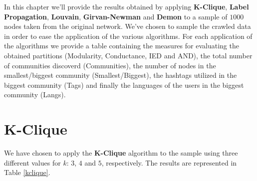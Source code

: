 In this chapter we'll provide the results obtained by applying \textbf{K-Clique}, \textbf{Label Propagation},
\textbf{Louvain}, \textbf{Girvan-Newman} and \textbf{Demon} to a sample of $1000$ nodes taken from the original
network. We've chosen to sample the crawled data in order to ease the application of the various algorithms.
For each application of the algorithms we provide a table containing the measures for evaluating the obtained
partitions (Modularity, Conductance, IED and AND), the total number of communities discoverd
(Communities), the number of nodes in the smallest/biggest community (Smallest/Biggest), the hashtags utilized
in the biggest community (Tags) and finally the languages of the users in the biggest community (Langs).

\section{K-Clique} %
\label{sec:k_clique}
    We have chosen to apply the \textbf{K-Clique} algorithm to the sample using three different values for
    $k$: $3$, $4$ and $5$, respectively. The results are represented in Table \ref{kclique}.

    \begin{table}[H]
        \centering
        \begin{subtable}{\textwidth}
        \end{subtable}
        \caption{Evaluation of the partitions obtained by the application of the K-Clique algorithm.}
        \label{kclique}
    \end{table}

